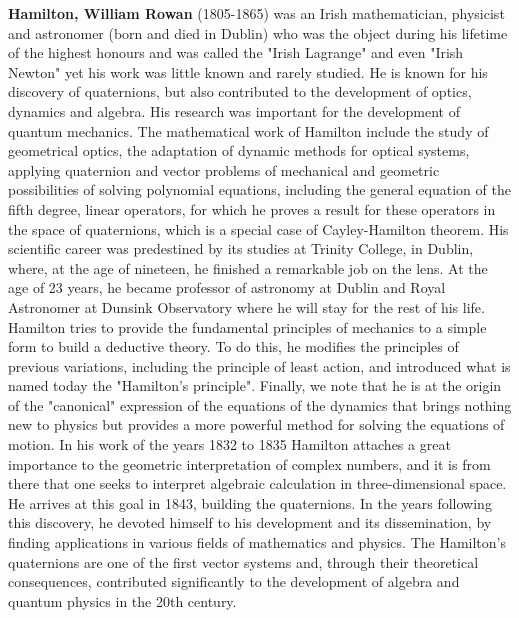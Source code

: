 \textbf{Hamilton, William Rowan} (1805-1865) was an Irish mathematician, physicist and astronomer (born and died in Dublin) who was the object during his lifetime of the highest honours and was called the "Irish Lagrange" and even "Irish Newton" yet his work was little known and rarely studied. He is known for his discovery of quaternions, but also contributed to the development of optics, dynamics and algebra. His research was important for the development of quantum mechanics. The mathematical work of Hamilton include the study of geometrical optics, the adaptation of dynamic methods for optical systems, applying quaternion and vector problems of mechanical and geometric possibilities of solving polynomial equations, including the general equation of the fifth degree, linear operators, for which he proves a result for these operators in the space of quaternions, which is a special case of Cayley-Hamilton theorem. His scientific career was predestined by its studies at Trinity College, in Dublin, where, at the age of nineteen, he finished a remarkable job on the lens. At the age of 23 years, he became professor of astronomy at Dublin and Royal Astronomer at Dunsink Observatory where he will stay for the rest of his life. Hamilton tries to provide the fundamental principles of mechanics to a simple form to build a deductive theory. To do this, he modifies the principles of previous variations, including the principle of least action, and introduced what is named today the "Hamilton's principle". Finally, we note that he is at the origin of the "canonical" expression of the equations of the dynamics that brings nothing new to physics but provides a more powerful method for solving the equations of motion. In his work of the years 1832 to 1835 Hamilton attaches a great importance to the geometric interpretation of complex numbers, and it is from there that one seeks to interpret algebraic calculation in three-dimensional space. He arrives at this goal in 1843, building the quaternions. In the years following this discovery, he devoted himself to his development and its dissemination, by finding applications in various fields of mathematics and physics. The Hamilton's quaternions are one of the first vector systems and, through their theoretical consequences, contributed significantly to the development of algebra and quantum physics in the 20th century.

